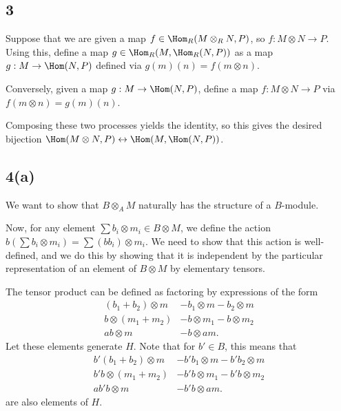 \documentclass[12pt, reqno]{amsart}
\begin{document}
\subsection*{3}

Suppose that we are given a map $f \in \Hom_R (M \otimes_R N, P)$, so 
$f : M \otimes N \to P$. 
Using this, define a map $g \in \Hom_R (M, \Hom_R(N, P))$ as a map 
$g: M \to \Hom(N, P)$ defined via $g(m)(n) = f(m \otimes n)$.

Conversely, given a map $g : M \to \Hom(N, P)$, define a map 
$f : M \otimes N \to P$ via $f(m \otimes n) = g(m)(n)$.

Composing these two processes yields the identity, so this gives the desired
bijection
$\Hom(M \otimes N, P) \leftrightarrow \Hom(M, \Hom(N, P))$.


\subsection*{4(a)}

We want to show that $B \otimes_A M$ naturally has the structure of a
$B$-module. 

Now, for any element $\sum b_i \otimes m_i \in B \otimes M$, we define the
action
$b \left( \sum b_i \otimes m_i \right) = \sum (b b_i) \otimes m_i$.
We need to show that this action is well-defined, and we do this by showing
that it is independent by the particular representation of an element of $B
\otimes M$ by elementary tensors.

The tensor product can be defined as factoring by expressions of the form
\begin{align*} 
(b_1 + b_2) \otimes m &- b_1 \otimes m - b_2 \otimes m \\
b \otimes (m_1 + m_2) &- b \otimes m_1 - b \otimes m_2 \\
ab \otimes m &- b \otimes am.
\end{align*} 
Let these elements generate $H$.
Note that for $b' \in B$, this means that
\begin{align*} 
b'(b_1 + b_2) \otimes m &- b'b_1 \otimes m - b'b_2 \otimes m \\
b'b \otimes (m_1 + m_2) &- b'b \otimes m_1 - b'b \otimes m_2 \\
ab'b \otimes m &- b'b \otimes am.
\end{align*} 
are also elements of $H$.
\end{document}
